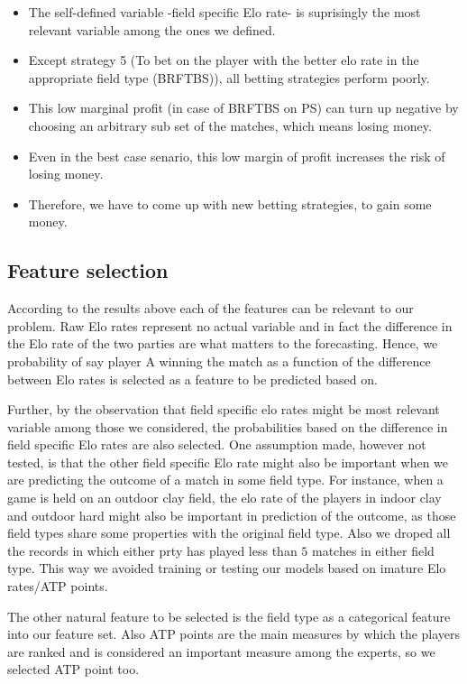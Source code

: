 \documentclass[preprint,aps,nofootinbib,a4paper,superscriptaddress,longbibliography,amsfonts,amssymb,amsmath,titlepage]{revtex4-2}
\begin{document}
\begin{itemize}
\item The self-defined variable -field specific Elo rate- is suprisingly the most relevant variable among the ones we defined.
\item Except strategy 5 (To bet on the player with the better elo rate in the appropriate field type (BRFTBS)), all betting strategies perform poorly.
\item This low marginal profit (in case of BRFTBS on PS) can turn up negative by choosing an arbitrary sub set of the matches, which means losing money.
\item Even in the best case senario, this low margin of profit increases the risk of losing money.
\item Therefore, we have to come up with new betting strategies, to gain some money.
\end{itemize}


\subsection{Feature selection}

According to the results above each of the features can be relevant to our problem. Raw Elo rates represent no actual variable and in fact the difference in the Elo rate of the two parties are what matters to the forecasting. Hence, we probability of say player A winning the match as a function of the difference between Elo rates is selected as a feature to be predicted based on.

Further, by the observation that field specific elo rates might be most relevant variable among those we considered, the probabilities based on the difference in field specific Elo rates are also selected. One assumption made, however not tested, is that the other field specific Elo rate might also be important when we are predicting the outcome of a match in some field type. For instance, when a game is held on an outdoor clay field, the elo rate of the players in indoor clay and outdoor hard might also be important in prediction of the outcome, as those field types share some properties with the original field type. Also we droped all the records in which either prty has played less than $5$ matches in either field type. This way we avoided training or testing our models based on imature Elo rates/ATP points.

The other natural feature to be selected is the field type as a categorical feature into our feature set. Also ATP points are the main measures by which the players are ranked and is considered an important measure among the experts, so we selected ATP point too.
\end{document}

